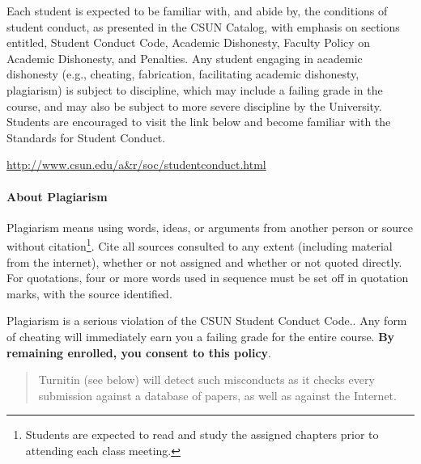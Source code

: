 \documentclass[
  letterpaper,
  DIV=11,
  numbers=noendperiod]{scrartcl}
\let\oldparagraph\paragraph
\renewcommand{\paragraph}[1]{\oldparagraph{#1}\mbox{}}
\begin{document}
\begin{tcolorbox}[enhanced jigsaw, toptitle=1mm, left=2mm, colframe=quarto-callout-important-color-frame, titlerule=0mm, opacityback=0, colbacktitle=quarto-callout-important-color!10!white, opacitybacktitle=0.6, leftrule=.75mm, toprule=.15mm, bottomrule=.15mm, rightrule=.15mm, bottomtitle=1mm, breakable, title=\textcolor{quarto-callout-important-color}{\faExclamation}\hspace{0.5em}{Important}, coltitle=black, arc=.35mm, colback=white]

Each student is expected to be familiar with, and abide by, the
conditions of student conduct, as presented in the CSUN Catalog, with
emphasis on sections entitled, Student Conduct Code, Academic
Dishonesty, Faculty Policy on Academic Dishonesty, and Penalties. Any
student engaging in academic dishonesty (e.g., cheating, fabrication,
facilitating academic dishonesty, plagiarism) is subject to discipline,
which may include a failing grade in the course, and may also be subject
to more severe discipline by the University. Students are encouraged to
visit the link below and become familiar with the Standards for Student
Conduct.

\url{http://www.csun.edu/a\&r/soc/studentconduct.html}

\end{tcolorbox}

\hypertarget{about-plagiarism}{%
\paragraph{About Plagiarism}\label{about-plagiarism}}

Plagiarism means using words, ideas, or arguments from another person or
source without citation\footnote{Students are expected to read and study
  the assigned chapters prior to attending each class meeting.}. Cite
all sources consulted to any extent (including material from the
internet), whether or not assigned and whether or not quoted directly.
For quotations, four or more words used in sequence must be set off in
quotation marks, with the source identified.

Plagiarism is a serious violation of the CSUN Student Conduct Code.. Any
form of cheating will immediately earn you a failing grade for the
entire course. \textbf{By remaining enrolled, you consent to this
policy}.

\begin{quote}
Turnitin (see below) will detect such misconducts as it checks every
submission against a database of papers, as well as against the
Internet.
\end{quote}
\end{document}
